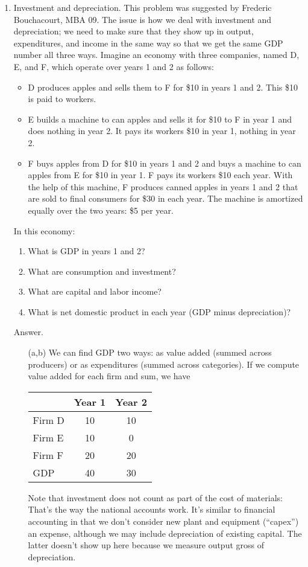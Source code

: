 \begin{enumerate}
\item Investment and depreciation.
This problem was suggested by Frederic Bouchacourt, MBA 09.
The issue is how we deal with investment and depreciation;
we need to make sure that they show up in output, expenditures, and income
in the same way so that we get the same GDP number all three ways.
Imagine an economy with three companies,
named D, E, and F,
which operate over years 1 and 2 as follows:
\begin{itemize}
\item D produces apples and sells them to F for \$10
    in years 1 and 2.
    This \$10 is paid to workers.
\item E builds a machine to can apples and sells it for \$10 to F in year 1 and does nothing in year 2.
    It pays its workers \$10 in year 1, nothing in year 2.
\item  F buys apples from D for \$10 in years 1 and 2 and buys a machine to can apples from E for \$10 in year 1.
    F pays its workers \$10 each year.
    With the help of this machine, F produces canned apples in years 1 and 2 that are sold to final consumers for \$30 in each year.
The machine is amortized equally over the two years:  \$5 per year.
\end{itemize}
In this economy:
\begin{enumerate}
\item What is GDP in years 1 and 2?
\item What are consumption and investment?
\item What are capital and labor income?
\item What is net domestic product in each year
(GDP minus depreciation)?
\end{enumerate}

Answer.
\begin{enumerate}
\item[(a,b)]
We can find GDP two ways:  as value added (summed across producers)
or as expenditures (summed across categories).
If we compute value added for each firm and sum, we have
%
    \begin{center}
    \begin{tabular}{lcc}
    \toprule
            &  Year 1  & Year 2 \\
            \midrule
    Firm D  &  10      &  10   \\
    Firm E  &  10      &  0 \\
    Firm F  &  20      &  20  \\
    \midrule
    GDP     &  40   &    30\\
    \bottomrule
    \end{tabular}
    \end{center}
%
Note that investment does not count as part of the cost
of materials:  That's the way the national accounts work.
It's similar to financial accounting
 in that we don't consider
new plant and equipment (``capex'') an expense,
although we may include depreciation of existing capital.
The latter doesn't show up here because we measure output
gross of depreciation.


\end{enumerate}
\end{enumerate}
